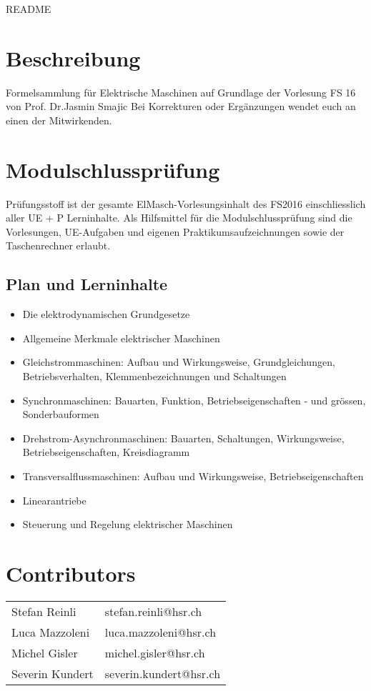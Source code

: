 \thispagestyle{empty}
\setcounter{page}{0} %
{\huge README }
\section*{Beschreibung}
Formelsammlung für Elektrische Maschinen auf Grundlage der Vorlesung FS 16 von Prof. Dr.Jasmin Smajic \newline
Bei Korrekturen oder Ergänzungen wendet euch an einen der Mitwirkenden.

\section*{Modulschlussprüfung}
Prüfungsstoff ist der gesamte ElMasch-Vorlesungsinhalt des FS2016 einschliesslich aller UE + P Lerninhalte.\newline
Als Hilfsmittel für die Modulschlussprüfung sind die Vorlesungen,\newline
UE-Aufgaben und eigenen Praktikumsaufzeichnungen sowie der Taschenrechner erlaubt.

\subsection*{Plan und Lerninhalte}
{\scriptsize 
\begin{itemize}
    \item Die elektrodynamischen Grundgesetze 
    \item Allgemeine Merkmale elektrischer Maschinen 
    \item Gleichstrommaschinen: 
    \subitem Aufbau und Wirkungsweise, Grundgleichungen, Betriebsverhalten, Klemmenbezeichnungen und Schaltungen 
    \item Synchronmaschinen: Bauarten, Funktion, Betriebseigenschaften - und grössen, Sonderbauformen 
    \item Drehstrom-Asynchronmaschinen: 
    \subitem Bauarten, Schaltungen, Wirkungsweise, Betriebseigenschaften, Kreisdiagramm 
    \item Transversalflussmaschinen: Aufbau und Wirkungsweise, Betriebseigenschaften
    \item Linearantriebe
    \item Steuerung und Regelung elektrischer Maschinen
\end{itemize}
}
\vfill
\section*{Contributors}
\begin{tabular}{ll}
	Stefan Reinli   & stefan.reinli@hsr.ch   \\
	Luca Mazzoleni  & luca.mazzoleni@hsr.ch  \\
	Michel Gisler   & michel.gisler@hsr.ch   \\
	Severin Kundert & severin.kundert@hsr.ch
\end{tabular} 

